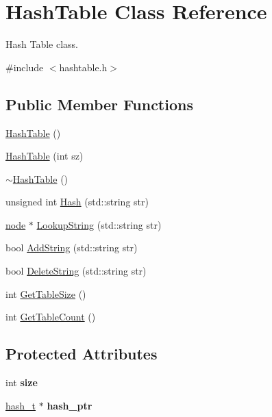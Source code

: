 \hypertarget{classHashTable}{\section{Hash\-Table Class Reference}
\label{classHashTable}
}


Hash Table class.  




{\ttfamily \#include $<$hashtable.\-h$>$}

\subsection*{Public Member Functions}
\begin{DoxyCompactItemize}
\item 
\hyperlink{classHashTable_adc3bf2b214c572819ba957ad314d7db3}{Hash\-Table} ()
\item 
\hyperlink{classHashTable_ad34603ecbe631c2609cf8bf6eb0e4234}{Hash\-Table} (int sz)
\item 
\hyperlink{classHashTable_a9ce5569bb945880cacb29aaba6f3e3f9}{$\sim$\-Hash\-Table} ()
\item 
unsigned int \hyperlink{classHashTable_af9de52d84a6f01768c1df4c228ae2b68}{Hash} (std\-::string str)
\item 
\hyperlink{structnode}{node} $\ast$ \hyperlink{classHashTable_a74b073c516dc278f73d08a4ea96cca77}{Lookup\-String} (std\-::string str)
\item 
bool \hyperlink{classHashTable_aa434d220762650368342c0b359537c13}{Add\-String} (std\-::string str)
\item 
bool \hyperlink{classHashTable_aeac528624c0abb98d25195c931087653}{Delete\-String} (std\-::string str)
\item 
int \hyperlink{classHashTable_a685b9fc2d98808166718fd3f7cbd0f5e}{Get\-Table\-Size} ()
\item 
int \hyperlink{classHashTable_a9c1d6c48eb05f677330cfba9cb8d30cf}{Get\-Table\-Count} ()
\end{DoxyCompactItemize}
\subsection*{Protected Attributes}
\begin{DoxyCompactItemize}
\item 
\hypertarget{classHashTable_ad732056fce42df5162c810b4dd28fca1}{int {\bfseries size}}\label{classHashTable_ad732056fce42df5162c810b4dd28fca1}

\item 
\hypertarget{classHashTable_a3cac095e178b62dffa384f63e903918a}{\hyperlink{structhash__t}{hash\-\_\-t} $\ast$ {\bfseries hash\-\_\-ptr}}\label{classHashTable_a3cac095e178b62dffa384f63e903918a}

\end{DoxyCompactItemize}


